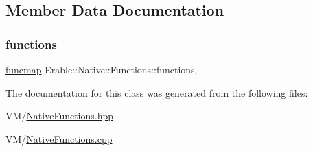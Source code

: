 \subsection{Member Data Documentation}
\mbox{\label{class_erable_1_1_native_1_1_functions_abf72e0b257bbaea52491a7185915596f}} 
\subsubsection{\texorpdfstring{functions}{functions}}
{\footnotesize\ttfamily \mbox{\hyperlink{namespace_erable_1_1_native_a6b24cdc21d4331b17b20ec0d3ed9e851}{funcmap}} Erable\+::\+Native\+::\+Functions\+::functions\hspace{0.3cm}{\ttfamily [inline]}, {\ttfamily [static]}}



The documentation for this class was generated from the following files\+:\begin{DoxyCompactItemize}
\item 
V\+M/\mbox{\hyperlink{_native_functions_8hpp}{Native\+Functions.\+hpp}}\item 
V\+M/\mbox{\hyperlink{_native_functions_8cpp}{Native\+Functions.\+cpp}}\end{DoxyCompactItemize}
